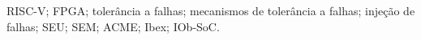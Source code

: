 \acresetall

\noindent RISC-V; FPGA; tolerância a falhas; mecanismos de tolerância a falhas; injeção de falhas; SEU; SEM; ACME; Ibex; IOb-SoC.